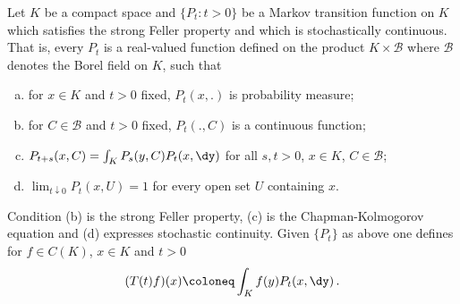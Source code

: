 \begin{example}\label{ex:b4-2.6}
	Let $K$ be a compact space and $\{P_t \colon t > 0\}$ be a
	Markov transition function on $K$ which satisfies the strong Feller
	property and which is stochastically continuous.
	That is, every
	$P_t$ is a real-valued function defined on the product $K \times \mathcal{B}$ where $\mathcal{B}$
	denotes the Borel field on $K$, such that
	\begin{enumerate}[(a)]
		\item 
		for $x \in K$ and $t > 0$ fixed, $P_t(x,.)$ is probability measure;
	
		\item 
		for $C \in \mathcal{B}$ and $t > 0$ fixed, $P_t(.,C)$ is a continuous function;
	
		\item 
		$P_{t+s}(x,C) = \int_K P_s(y,C)P_t(x,\dy)$ for all $s,t > 0$, $x \in K$, $C \in \mathcal{B}$;
	
		\item 
		$\lim_{t\downarrow0} P_t(x,U) = 1$ for every open set $U$ containing $x$.
	\end{enumerate}
	Condition (b) is the strong Feller property, (c) is the Chapman-Kolmogorov equation and (d) expresses stochastic continuity.
	Given $\{P_t\}$ as above one defines for $f \in C(K)$, $x \in K$ and $t > 0$
	\begin{equation}\label{eq:b4-2.4}
		(T(t)f)(x)  \coloneq  \int_K f(y)P_t(x,\dy)\,.
	\end{equation}
	

\end{example}
